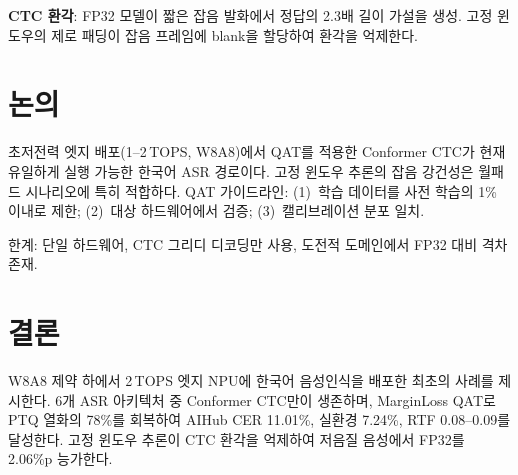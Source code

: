 \documentclass[a4paper,11pt,twocolumn]{article}
\begin{document}
\textbf{CTC 환각}: FP32 모델이 짧은 잡음 발화에서 정답의 2.3배 길이 가설을 생성. 고정 윈도우의 제로 패딩이 잡음 프레임에 blank을 할당하여 환각을 억제한다.

\section{논의}

초저전력 엣지 배포(1--2\,TOPS, W8A8)에서 QAT를 적용한 Conformer CTC가 현재 유일하게 실행 가능한 한국어 ASR 경로이다. 고정 윈도우 추론의 잡음 강건성은 월패드 시나리오에 특히 적합하다. QAT 가이드라인: (1)~학습 데이터를 사전 학습의 1\% 이내로 제한; (2)~대상 하드웨어에서 검증; (3)~캘리브레이션 분포 일치.

한계: 단일 하드웨어, CTC 그리디 디코딩만 사용, 도전적 도메인에서 FP32 대비 격차 존재.

\section{결론}

W8A8 제약 하에서 2\,TOPS 엣지 NPU에 한국어 음성인식을 배포한 최초의 사례를 제시한다. 6개 ASR 아키텍처 중 Conformer CTC만이 생존하며, MarginLoss QAT로 PTQ 열화의 78\%를 회복하여 AIHub CER 11.01\%, 실환경 7.24\%, RTF 0.08--0.09를 달성한다. 고정 윈도우 추론이 CTC 환각을 억제하여 저음질 음성에서 FP32를 2.06\%p 능가한다.
\end{document}
